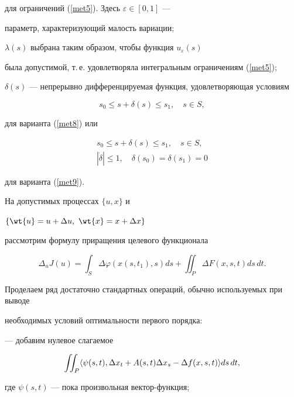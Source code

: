 для ограничений (\ref{met5}). Здесь $\varepsilon\in [0,1]$ ---


параметр, характеризующий малость вариации;


$\lambda (s)$ выбрана таким образом, чтобы функция $u_\varepsilon(s)$ 


была допустимой, т.\,е. удовлетворяла интегральным ограничениям (\ref{met5});


$\delta (s)$ --- непрерывно дифференцируемая функция, удовлетворяющая условиям


$$


s_0\leq s+\delta (s)\leq s_1,\quad s\in S,


$$


для варианта (\ref{met8}) или


\begin{gather*}


s_0\leq s+\delta (s)\leq s_1,\quad s\in S, \\


|\Dot{\delta}|\leq 1,\quad\delta(s_0)=\delta(s_1)=0


\end{gather*} 


для варианта (\ref{met9}).





На допустимых процессах $\{u,x\}$ и


$\{\wt{u}=u+\Delta u,\ \wt{x}=x+\Delta x\}$


рассмотрим формулу приращения целевого функционала 


$$


\Delta_u J(u)=\int_S\Delta \varphi (x(s,t_1),s) ds+


\iint_P \Delta F(x,s,t) ds\, dt.


$$





Проделаем ряд достаточно стандартных операций, обычно используемых при выводе


необходимых условий оптимальности первого порядка:





--- добавим нулевое слагаемое


$$


\iint_P \la\psi (s,t),\Delta x_t +A(s,t)\Delta x_s-


\Delta f(x,s,t)\ra ds\, dt,


$$


где $\psi (s,t)$ --- пока произвольная вектор-функция;





